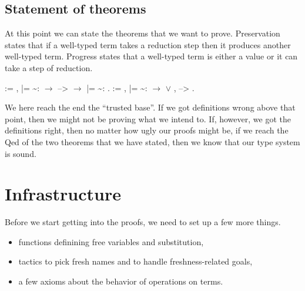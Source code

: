 \documentclass[12pt]{report}
\begin{document}
\subsection{Statement of theorems}



 At this point we can state the theorems that we want to prove.
    Preservation states that if a well-typed term takes a reduction
    step then it produces another well-typed term.
    Progress states that a well-typed term is either a value or it 
    can take a step of reduction. 
\begin{coqdoccode}
\coqdocemptyline
\coqdocnoindent
{}  := \coqdockw{\ensuremath{\forall}}    ,\coqdoceol
\coqdocindent{1.00em}
 |=  \~{}:  \ensuremath{\rightarrow}\coqdoceol
\coqdocindent{1.00em}
 -->  \ensuremath{\rightarrow}\coqdoceol
\coqdocindent{1.00em}
 |=  \~{}: .\coqdoceol
\coqdocemptyline
\coqdocnoindent
{}  := \coqdockw{\ensuremath{\forall}}  , \coqdoceol
\coqdocindent{1.00em}
 |=  \~{}:  \ensuremath{\rightarrow}\coqdoceol
\coqdocindent{2.50em}
  \coqdoceol
\coqdocindent{1.00em}
\ensuremath{\lor} \coqdoctac{\ensuremath{\exists}} ,  --> .\coqdoceol
\coqdocemptyline
\end{coqdoccode}
We here reach the end the ``trusted base''. If we got definitions wrong
    above that point, then we might not be proving what we intend to.
    If, however, we got the definitions right, then no matter how ugly
    our proofs might be, if we reach the Qed of the two theorems that
    we have stated, then we know that our type system is sound.
\begin{coqdoccode}
\coqdocemptyline
\end{coqdoccode}
\section{Infrastructure}



 Before we start getting into the proofs, we need to set up a few
    more things.

\begin{itemize}
\item  functions definining free variables and substitution,

\item  tactics to pick fresh names and to handle freshness-related goals,

\item  a few axioms about the behavior of operations on terms.

\end{itemize}
\end{document}
